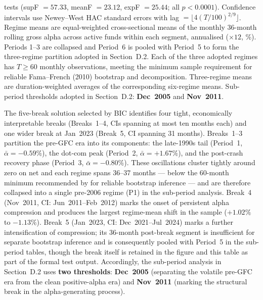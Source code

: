 \documentclass[12pt]{article}
\begin{document}
\begin{table}[H]
\begin{minipage}{\linewidth}
tests (supF $= 57.33$, meanF $= 23.12$, expF $= 25.44$; all $p < 0.0001$).
Confidence intervals use Newey--West HAC standard errors \parencite{Andrews1991}
with lag $= \lfloor 4(T/100)^{2/9} \rfloor$.
Regime means are equal-weighted cross-sectional means of the monthly
36-month rolling \textcite{Carhart1997} gross alpha across active funds within
each segment, annualised ($\times 12$, \%). Periods 1--3 are collapsed and
Period~6 is pooled with Period~5 to form the three-regime partition adopted
in Section~D.2. Each of the three adopted regimes has $T\geq 60$ monthly
observations, meeting the minimum sample requirement for reliable
Fama--French (2010) bootstrap and \textcite{BarrasScailletWermers2010}
decomposition. Three-regime means are duration-weighted averages of the
corresponding six-regime means. Sub-period thresholds adopted in
Section~D.2: \textbf{Dec~2005} and \textbf{Nov~2011}.
\end{minipage}
\end{table}

\noindent The five-break solution selected by BIC identifies four tight,
economically interpretable breaks (Breaks~1--4, CIs spanning at most ten
months each) and one wider break at Jan~2023 (Break~5, CI spanning
31 months). Breaks~1--3 partition the pre-GFC era into its components:
the late-1990s tail (Period~1, $\bar{\alpha} = -0.59\%$), the dot-com peak
(Period~2, $\bar{\alpha} = +1.67\%$), and the post-crash recovery phase
(Period~3, $\bar{\alpha} = -0.80\%$). These oscillations cluster tightly
around zero on net and each regime spans 36--37 months --- below the
60-month minimum recommended by \textcite{BarrasScailletWermers2010} for
reliable bootstrap inference --- and are therefore collapsed into a single
pre-2006 regime (P1) in the sub-period analysis. Break~4 (Nov~2011,
CI: Jun~2011--Feb~2012) marks the onset of persistent alpha compression
and produces the largest regime-mean shift in the sample
($+1.02\%$ to $-1.13\%$). Break~5 (Jan~2023, CI: Dec~2021--Jul~2024) marks
a further intensification of compression; its 36-month post-break segment
is insufficient for separate bootstrap inference and is consequently pooled
with Period~5 in the sub-period tables, though the break itself is
retained in the figure and this table as part of the formal test output.
Accordingly, the sub-period analysis in Section~D.2 uses \textbf{two
thresholds}: \textbf{Dec~2005} (separating the volatile pre-GFC era from
the clean positive-alpha era) and \textbf{Nov~2011} (marking the structural
break in the alpha-generating process).
\end{document}
